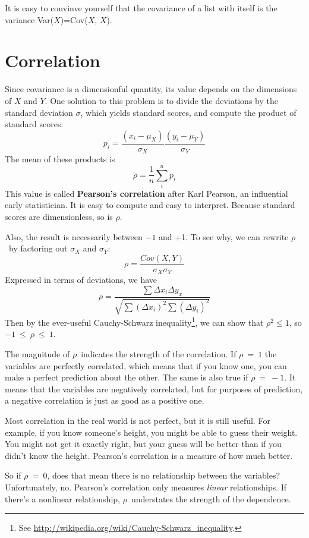It is easy to convinve yourself that the covariance of a list with itself is the variance
Var($X$)=Cov($X$, $X$).


\section{Correlation}

Since covariance is a dimensionful quantity, its value depends on the dimensions of $X$ and $Y$. 
One solution to this problem is to divide the deviations by the standard deviation $\sigma$,
which yields standard scores, and compute the product of standard scores:
%
\[ p_i = \frac{(x_i - \mu_X)}{\sigma_X} \frac{(y_i - \mu_Y)}{\sigma_Y} \]
%
The mean of these products is
%
\[ \rho = \frac{1}{n} \sum_i^n p_i \]
%
This value is called {\bf Pearson's correlation} after Karl Pearson,
an influential early statistician.  It is easy to compute and easy to
interpret.  Because standard scores are dimensionless, so is $\rho$.

Also, the result is necessarily between $-1$ and +1.  To see why, we
can rewrite $\rho$~by factoring out $\sigma_{X}$ and $\sigma_Y$:
%
\[ \rho = \frac{Cov(X,Y)}{\sigma_X \sigma_Y} \]
%
Expressed in terms of deviations, we have
%
\[ \rho = \frac{\sum \Delta x_i \Delta y_x}{\sqrt{\sum (\Delta x_i)^2 \sum (\Delta y_i)^2}} \]
%
Then by the ever-useful Cauchy-Schwarz inequality\footnote{See
  \url{http://wikipedia.org/wiki/Cauchy-Schwarz_inequality}.}, we can show
that $\rho^{2} \le 1$, so $-1~\le~\rho~\le~1$.

The magnitude of $\rho$~indicates the strength of the correlation.  If
$\rho~=~1$ the variables are perfectly correlated, which means that if
you know one, you can make a perfect prediction about the other.  The
same is also true if $\rho~=~-1$.  It means that the variables
are negatively correlated, but for purposes of prediction, a
negative correlation is just as good as a positive one.

Most correlation in the real world is not perfect, but it
is still useful.  For example, if you know someone's height, you might
be able to guess their weight.  You might not get it exactly right, but
your guess will be better than if you didn't know the height.
Pearson's correlation is a measure of how much better.

So if $\rho~=~0$, does that mean there is no
relationship between the variables?  Unfortunately, no.  Pearson's
correlation only measures {\em linear} relationships.  If there's a
nonlinear relationship, $\rho$~understates the strength of the
dependence.

